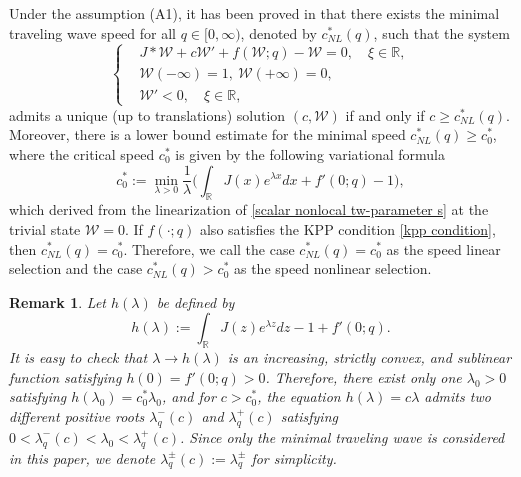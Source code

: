 \documentclass[11pt,a4paper]{article}
\newtheorem{remark}[theorem]{\textbf{Remark}}
\numberwithin{equation}{section}
\numberwithin{figure}{section}
\begin{document}

Under the assumption (A1), it has been proved in \cite{Coville} that there exists the minimal traveling wave speed for all $q\in[0,\infty)$, denoted by $c_{NL}^*(q)$, such that
the system
\begin{equation}\label{scalar nonlocal tw-parameter s}
\left\{
\begin{aligned}
&J\ast \mathcal{W}+c\mathcal{W}'+f(\mathcal{W};q)-\mathcal{W}=0,\quad  \xi\in\mathbb{R},\\
&\mathcal{W}(-\infty)=1,\ \mathcal{W}(+\infty)=0,\\
&\mathcal{W}'<0,\quad \xi\in\mathbb{R},
\end{aligned}
\right.
\end{equation}
admits a unique (up to translations) solution $(c,\mathcal{W})$ if and only if
$c\geq c_{NL}^*(q)$. %
Moreover, there is a lower bound estimate for the minimal speed $c_{NL}^*(q)\geq c_0^*$,
where the critical speed $c_0^*$ is given by the following variational formula
\begin{equation}\label{formula of c_NL}
c_{0}^*:=\min_{\lambda>0}\frac{1}{\lambda}\Big(\int_{\mathbb{R}}J(x)e^{\lambda x}dx+f'(0;q)-1\Big),
\end{equation}
which derived from the linearization of \eqref{scalar nonlocal tw-parameter s} at the trivial state $\mathcal{W}= 0$.
If $f(\cdot;q)$ also satisfies the KPP condition \eqref{kpp condition}, then
$c_{NL}^*(q)= c_0^*$. Therefore, we call the case $c_{NL}^*(q)= c_0^*$ as the speed linear selection and the case $c_{NL}^*(q)> c_0^*$ as the speed nonlinear selection.



\begin{remark}\label{rm:lambda_0}
Let $h(\lambda)$ be defined by
$$h(\lambda):=\int_{\mathbb{R}}J(z)e^{\lambda z}dz-1+f'(0;q).$$
It is easy to check that $\lambda\to h(\lambda)$ is an increasing, strictly convex, and sublinear function satisfying $h(0)=f'(0;q)>0$.
Therefore, there exist only one $\lambda_0>0$ satisfying $h(\lambda_0)=c_0^*\lambda_0$, and for $c>c_0^*$, the equation $h(\lambda)=c\lambda$ admits two different positive roots $\lambda_q^-(c)$ and $\lambda_q^+(c)$ satisfying $0<\lambda_q^-(c)<\lambda_0<\lambda_q^+(c)$. Since only the minimal traveling wave is considered in this paper, we denote $\lambda_q^{\pm}(c):=\lambda_q^{\pm}$ for simplicity.
\end{remark}
\end{document}
